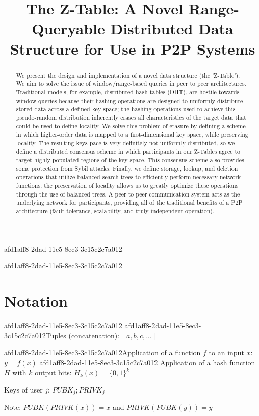 \documentclass[12pt]{article}
\title{The Z-Table: A Novel Range-Queryable Distributed Data Structure for Use in P2P Systems}
\begin{document}
afd1aff8-2dad-11e5-8ec3-3c15c2c7a012
\maketitle

afd1aff8-2dad-11e5-8ec3-3c15c2c7a012\begin{abstract}
We present the design and implementation of a novel data structure (the 'Z-Table'). We aim to solve the issue of window/range-based queries in peer to peer architectures. Traditional models, for example,  distributed hash tables (DHT), are hostile towards window queries because their hashing operations are designed to uniformly distribute stored data across a defined key space; the hashing operations used to achieve this pseudo-random distribution inherently erases all characteristics of the target data that could be used to define locality. We solve this problem of erasure by defining a scheme in which higher-order data is mapped to a first-dimensional key space, while preserving locality. The resulting keys pace is very definitely not uniformly distributed, so we define a distributed consensus scheme in which participants in our Z-Tables agree to target highly populated regions of the key space. This consensus scheme also provides some protection from Sybil attacks. Finally, we define storage, lookup, and deletion operations that utilize balanced search trees to efficiently perform necessary network functions; the preservation of locality allows us to greatly optimize these operations through the use of balanced trees. A peer to peer communication system acts as the underlying network for participants, providing all of the traditional benefits of a P2P architecture (fault tolerance, scalability, and truly independent operation).
\end{abstract}

\section{Notation}
afd1aff8-2dad-11e5-8ec3-3c15c2c7a012
afd1aff8-2dad-11e5-8ec3-3c15c2c7a012Tuples (concatenation): $[a,b,c,...]$

afd1aff8-2dad-11e5-8ec3-3c15c2c7a012Application of a function $f$ to an input $x$: $y=f(x)$
afd1aff8-2dad-11e5-8ec3-3c15c2c7a012
Application of a hash function $H$ with $k$ output bits: $H_{k}(x) = \{0,1\}^k$

Keys of user $j$: $ PUBK_j; PRIVK_j $

Note: $PUBK(PRIVK(x)) = x$ and $PRIVK(PUBK(y)) = y$~
\end{document}
